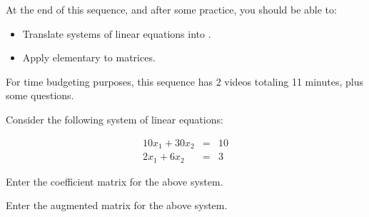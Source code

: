 







At the end of this sequence, and after some practice, you should be able to:

\begin{itemize}
\item Translate systems of linear equations into {}.
\item Apply elementary {} to matrices.  
\end{itemize}



For time budgeting purposes, this sequence has 2 videos totaling 11 minutes, 
plus some questions.  




\endedxtext

\endedxvertical








Consider the following system of linear equations:

\begin{eqnarray*}
10x_1 + 30x_2 & = & 10 \\
2x_1 + 6x_2 & = & 3 
\end{eqnarray*}



Enter the coefficient matrix for the above system.  







Enter the augmented matrix for the above system. 






